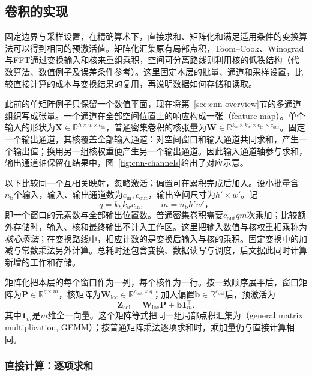 \subsection{卷积的实现}
\label{sec:cnn-implementation}

固定边界与采样设置，在精确算术下，直接求和、矩阵化和满足适用条件的变换算法可以得到相同的预激活值。矩阵化汇集原有局部点积，Toom--Cook、Winograd与FFT通过变换输入和核来重组乘积，空间可分离路线则利用核的低秩结构（代数算法、数值例子及误差条件参考）。这里固定本层的批量、通道和采样设置，比较直接计算的成本与变换结果的复用，再说明数据如何存储和读取。

此前的单矩阵例子只保留一个数值平面，现在将第~\ref{sec:cnn-overview}节的多通道组织写成张量。一个通道在全部空间位置上的响应构成一张（feature map）。单个输入的形状为$\bm X\in\mathbb R^{h\times w\times c_{\mathrm{in}}}$，普通密集卷积的核张量为$\bm W\in\mathbb R^{k_h\times k_w\times c_{\mathrm{in}}\times c_{\mathrm{out}}}$。固定一个输出通道，其核覆盖全部输入通道：对空间窗口和输入通道共同求和，产生一个输出值；换用另一组核权重便产生另一个输出通道。因此输入通道轴参与求和，输出通道轴保留在结果中，图~\ref{fig:cnn-channels}给出了对应示意。

以下比较同一个互相关映射，忽略激活；偏置可在累积完成后加入。设小批量含$n_{\mathrm b}$个输入，输入、输出通道数为$c_{\mathrm{in}},c_{\mathrm{out}}$，输出空间尺寸为$h'\times w'$。记
\[
  q=k_hk_wc_{\mathrm{in}},\qquad m=n_{\mathrm b}h'w'\text{，}
\]
即一个窗口的元素数与全部输出位置数。普通密集卷积需要$c_{\mathrm{out}}qm$次乘加；比较额外存储时，输入、核和最终输出不计入工作区。这里把输入数值与核权重相乘称为\emph{核心乘法}；在变换路线中，相应计数的是变换后输入与核的乘积。固定变换中的加减与常数乘法另外计算。总耗时还包含变换、数据读写与调度，后文据此同时计算新增的工作和存储。

矩阵化把本层的每个窗口作为一列，每个核作为一行。按一致顺序展平后，窗口矩阵为$\bm P\in\mathbb R^{q\times m}$，核矩阵为$\bm W_{\mathrm{loc}}\in\mathbb R^{c_{\mathrm{out}}\times q}$；加入偏置$\bm b\in\mathbb R^{c_{\mathrm{out}}}$后，预激活为
\begin{equation}
 \bm Z_{\mathrm{col}}=\bm W_{\mathrm{loc}}\bm P+\bm b\bm1_m^\top.
 \label{eq:cnn-im2col}
\end{equation}
其中$\bm1_m$是$m$维全一向量。这个矩阵等式把同一组局部点积汇集为（general matrix multiplication, GEMM）；按普通矩阵乘法逐项求和时，乘加量仍与直接计算相同。

\subsubsection{直接计算：逐项求和}
\label{sec:cnn-direct-implementation}

